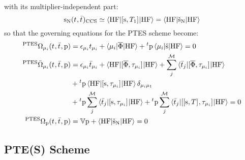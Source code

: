 with its multiplier-independent part:
\begin{equation}
  \mathrm{s}_{\mathrm{N}}(t_{}, \bar{t}_{})_\mathrm{CCS}
  \simeq
  \braket{\mathrm{HF} | [ \mathrm{s}, T_1 ]^{} | \mathrm{HF}}
  =
  \braket{\mathrm{HF} | \check{\mathrm{s}}_{\mathrm{N}} | \mathrm{HF}}
\end{equation}
so that the governing equations for the \acrshort{PTES} scheme become:
\begin{subequations}
  \begin{align}
   {}^{\mathrm{PTES}}\Omega_{\mu_i}(t_{}, \bar{t}_{}, \mathrm{p})  &=
   \epsilon_{\mu_i}t_{\mu_i} + \braket{\mu_i | \overline{\Phi} | \mathrm{HF}}
   + {}^t\mathrm{p}\braket{\mu_i | \check{\mathrm{s}} | \mathrm{HF}}
             = 0 \label{eq:ptes-cc-amplitudes}\\
   {}^{\mathrm{PTES}}\bar{\Omega}_{\mu_i}(t_{}, \bar{t}_{}, \mathrm{p})
    &=
    \epsilon_{\mu_i}\bar{t}_{\mu_i} +
    \braket{\mathrm{HF} | [ \overline{\Phi}, \tau_{\mu_i} ]^{} | \mathrm{HF}} +
    \sum_{j}^{\mathcal{M}}\braket{\bar{t}_{j} |
    [ \overline{\Phi}, \tau_{\mu_i} ]^{} | \mathrm{HF}}
    \nonumber \\
    &+
    {}^t\mathrm{p}\braket{\mathrm{HF} | [ \mathrm{s}, \tau_{\mu_i} ]^{} | \mathrm{HF}}\delta_{\mu_i\mu_1} \nonumber \\
    &+
    {}^t\mathrm{p}\sum_{j}^{\mathcal{M}}\braket{\bar{t}_{j} | [ \mathrm{s}, \tau_{\mu_i} ]^{} | \mathrm{HF}}
    +
    {}^t\mathrm{p}\sum_{j}^{\mathcal{M}}\braket{\bar{t}_{j} | [ [ \mathrm{s}, T ]^{}, \tau_{\mu_i} ]^{} | \mathrm{HF}}
             = 0 \label{eq:ptes-cc-multipliers}\\
    {}^{\mathrm{PTES}}\Omega_{\mathrm{p}}(t_{}, \bar{t}_{}, \mathrm{p})
    &=
    \mathbb{V}\mathrm{p} + \braket{\mathrm{HF} | \check{\mathrm{s}}_{\mathrm{N}} | \mathrm{HF}} = 0
    \label{eq:ptes-cc-polarization}
  \end{align}
\end{subequations}


\subsection*{PTE(S) Scheme}

